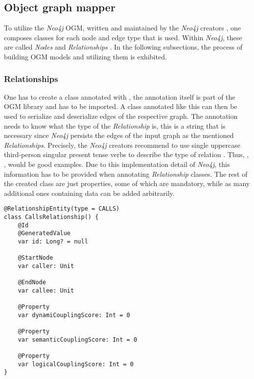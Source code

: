 \documentclass[12pt,a4paper]{report}
\begin{document}
\subsection{Object graph mapper}

To utilize the \textit{Neo4j} OGM, written and maintained by the \textit{Neo4j}
creators \cite{neo4j-ogm}, one composes classes for each node and edge type
that is used. Within \textit{Neo4j}, these are called \textit{Nodes} and
\textit{Relationships} \cite{neo4j-ogm}.
In the following subsections, the process of building OGM models and utilizing
them is exhibited.


\subsubsection{Relationships}
One has to create a class annotated with ,
the annotation itself is part of the OGM library and has to be imported.
A class annotated like this can then be used to serialize and deserialize edges
of the respective graph. The annotation needs to know what the type of the
\textit{Relationship} is, this is a string that is necessary since \textit{Neo4j}
persists the edges of the input graph as the mentioned \textit{Relationships}.
Precisely, the \textit{Neo4j} creators recommend to use single uppercase third-person
singular present tense verbs to describe the type of relation \cite{neo4j-ogm}.
Thus, , ,  would
be good examples. Due to this implementation detail of \textit{Neo4j},
this information has to be provided when annotating \textit{Relationship} classes.
The rest of the created class are just properties, some of which are mandatory,
while as many additional ones containing data can be added arbitrarily.

\begin{lstlisting}[caption=Relationship OGM class, label=ogm-relationship, breaklines=true]
@RelationshipEntity(type = CALLS)
class CallsRelationship() {
    @Id
    @GeneratedValue
    var id: Long? = null

    @StartNode
    var caller: Unit

    @EndNode
    var callee: Unit

    @Property
    var dynamiCouplingScore: Int = 0

    @Property
    var semanticCouplingScore: Int = 0

    @Property
    var logicalCouplingScore: Int = 0
}
\end{lstlisting}
\end{document}
